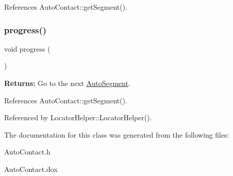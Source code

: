 References Auto\+Contact\+::get\+Segment().

\mbox{\label{classKatabatic_1_1LocatorHelper_a1be98ae64bededebc29a04f257024ebe}} 
\subsubsection{\texorpdfstring{progress()}{progress()}}
{\footnotesize\ttfamily void progress (\begin{DoxyParamCaption}{ }\end{DoxyParamCaption})\hspace{0.3cm}{\ttfamily [inline]}}

{\bfseries Returns\+:} Go to the next \mbox{\hyperlink{classKatabatic_1_1AutoSegment}{Auto\+Segment}}. 

References Auto\+Contact\+::get\+Segment().



Referenced by Locator\+Helper\+::\+Locator\+Helper().



The documentation for this class was generated from the following files\+:\begin{DoxyCompactItemize}
\item 
Auto\+Contact.\+h\item 
Auto\+Contact.\+dox\end{DoxyCompactItemize}
